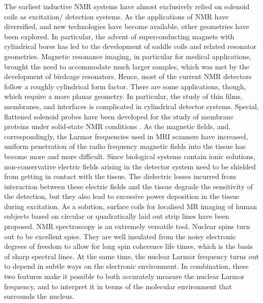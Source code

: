 The earliest inductive NMR systems have almost exclusively relied on solenoid coils as excitation/
detection systems. As the applications of NMR have diversified, and new technologies have become 
available, other geometries have been explored. In particular, the advent of superconducting magnets 
with cylindrical bores has led to the development of saddle coils and related resonator geometries. 
Magnetic resonance imaging, in particular for medical applications, brought the need to accommodate 
much larger samples, which was met by the development of birdcage resonators. 
Hence, most of the current NMR detectors follow a roughly cylindrical form factor. There are some 
applications, though, which require a more planar geometry. In particular, the study of thin films, 
membranes, and interfaces is complicated in cylindrical detector systems. Special, flattened solenoid 
probes have been developed for the study of membrane proteins under solid-state NMR conditions
\cite{Bechinger:1991in}. As the magnetic fields, and, correspondingly, the Larmor frequencies used in MRI scanners 
have increased, uniform penetration of the radio frequency magnetic fields into the tissue has become 
more and more difficult. Since biological systems contain ionic solutions, non-conservative electric 
fields arising in the detector system need to be shielded from getting in contact with the tissue. The 
dielectric losses incurred from interaction between these electric fields and the tissue degrade the 
sensitivity of the detection, but they also lead to excessive power deposition in the tissue during 
excitation. As a solution, surface coils for localised MR imaging of human subjects based on circular 
or quadratically laid out strip lines have been proposed. \cite{Zhang:2001js}
NMR spectroscopy is an extremely versatile tool. Nuclear spins turn out to be excellent spies. They are 
well insulated from the  noisy electronic degrees of freedom to allow for long spin coherence life 
times, which is the basis of sharp spectral lines. At the same time, the nuclear Larmor frequency turns 
out to depend in subtle ways on the electronic environment. In combination, these two features make it 
possible to both accurately measure the nuclear Larmor frequency, and to interpret it in terms of the 
molecular environment that surrounds the nucleus. 


